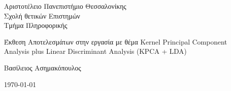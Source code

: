 \begin{titlepage}
	\afterpage{\blankpage}	
	\begin{figure}[H]
		\begin{center}
			\label{fig:cover_auth_logo}
		\end{center}
	\end{figure}
	
	\centering
	\Large Αριστοτέλειο Πανεπιστήμιο Θεσσαλονίκης\\
	\Large Σχολή θετικών Επιστημών\\
	\large Τμήμα Πληροφορικής\\

	
	\vspace{\fill}
	
	\LARGE Έκθεση Αποτελεσμάτων στην εργασία με θέμα Kernel Principal Component Analysis plus Linear Discriminant Analysis (KPCA + LDA)
	
	\vspace{\fill}
	
	Βασίλειος Ασημακόπουλος
	

	
	\centering

	\today
	
\end{titlepage}






